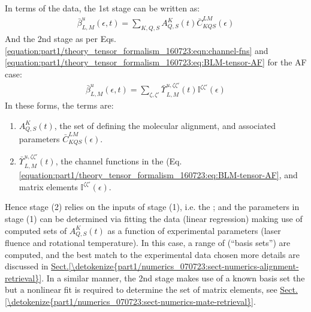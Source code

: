 \documentclass[letterpaper,table,10pt,english]{jupyterBook}
\begin{document}
\sphinxAtStartPar
In terms of the data, the 1st stage can be written as:
\begin{equation}\label{equation:part1/numerics_070723:eqn:beta-convolution-C}
\begin{split}
\bar{\beta}_{L,M}^{u}(\epsilon,t)=\sum_{K,Q,S}A_{Q,S}^{K}(t)\bar{C}_{KQS}^{LM}(\epsilon)
\end{split}
\end{equation}
\sphinxAtStartPar
And the 2nd stage as per Eqs. \eqref{equation:part1/theory_tensor_formalism_160723:eqn:channel-fns} and \eqref{equation:part1/theory_tensor_formalism_160723:eq:BLM-tensor-AF} for the AF case:
\begin{equation*}
\begin{split}
\bar{\beta}_{L,M}^{u}(\epsilon,t)=\sum_{\zeta,\zeta'}\bar{\varUpsilon_{}}_{L,M}^{u,\zeta\zeta'}(t)\mathbb{I}^{\zeta\zeta'}(\epsilon)
\end{split}
\end{equation*}
\sphinxAtStartPar
In these forms, the terms are:
\begin{enumerate}
%
\item {} 
\sphinxAtStartPar
\(A_{Q,S}^{K}(t)\), the set of {\hyperref[\detokenize{backmatter/glossary:term-ADMs}]{}} defining the molecular alignment, and associated parameters \(\bar{C}_{KQS}^{LM}(\epsilon)\).

\item {} 
\sphinxAtStartPar
\(\bar{\varUpsilon_{}}_{L,M}^{u,\zeta\zeta'}(t)\), the channel functions in the {\hyperref[\detokenize{backmatter/glossary:term-AF}]{}} (Eq. \eqref{equation:part1/theory_tensor_formalism_160723:eq:BLM-tensor-AF}, and matrix elements \(\mathbb{I}^{\zeta\zeta'}(\epsilon)\).

\end{enumerate}

\sphinxAtStartPar
Hence stage (2) relies on the inputs of stage (1), i.e. the {\hyperref[\detokenize{backmatter/glossary:term-ADMs}]{}}; and the parameters in stage (1) can be determined via fitting the data (linear regression) making use of computed sets of \(A_{Q,S}^{K}(t)\) as a function of experimental parameters (laser fluence and rotational temperature). In this case, a range of {\hyperref[\detokenize{backmatter/glossary:term-ADMs}]{}} (“basis sets”) are computed, and the best match to the experimental data chosen \sphinxhyphen{} more details are discussed in \hyperref[\detokenize{part1/numerics_070723:sect-numerics-alignment-retrieval}]{Sect.\@ \ref{\detokenize{part1/numerics_070723:sect-numerics-alignment-retrieval}}}. In a similar manner, the 2nd stage makes use of a known basis set \sphinxhyphen{} the {\hyperref[\detokenize{backmatter/glossary:term-channel-functions}]{}} \sphinxhyphen{} but a non\sphinxhyphen{}linear fit is required to determine the set of matrix elements, see \hyperref[\detokenize{part1/numerics_070723:sect-numerics-mate-retrieval}]{Sect.\@ \ref{\detokenize{part1/numerics_070723:sect-numerics-mate-retrieval}}}.
\end{document}
